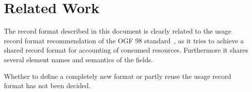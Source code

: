 \section{Related Work}



The record format described in this document is clearly related to the usage
record format recommendation of the OGF 98 standard~\cite{ogf98ur}, as it tries
to achieve a shared record format for accounting of consumed resources.
Furthermore it shares several element names and semantics of the fields.

Whether to define a completely new format or partly reuse the usage record
format has not been decided.



